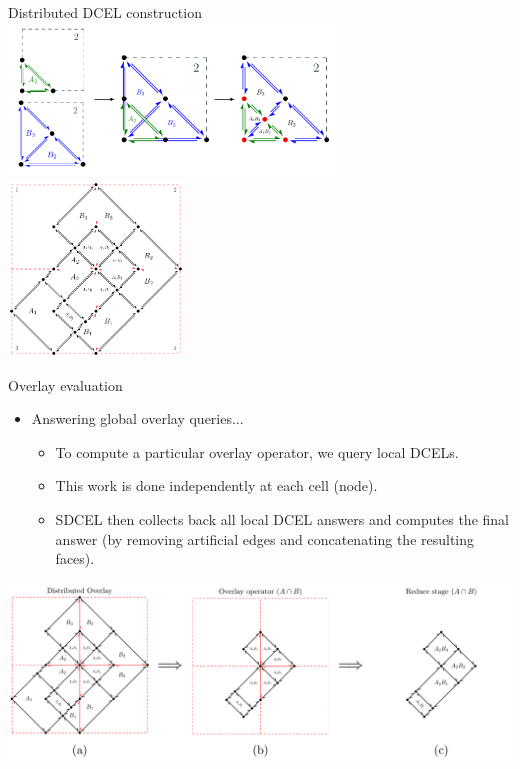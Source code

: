     \begin{frame}{Distributed DCEL construction}
        \centering
        \includegraphics[width=0.65\textwidth]{../thesis/chapterSDCEL/overlay_partition/overlay_partition} \\
        \vspace{0.5cm}
        \includegraphics[width=0.35\textwidth]{../thesis/chapterSDCEL/distributed_dcel}
    \end{frame}

   \begin{frame}{Overlay evaluation}
        \begin{itemize}
            \item Answering global overlay queries...
            \begin{itemize}
                \item To compute a particular overlay operator, we query local DCELs.
                \item This work is done independently at each cell (node).
                \item SDCEL then collects back all local DCEL answers and computes the final answer (by removing artificial edges and concatenating the resulting faces).
            \end{itemize}
        \end{itemize}
        \vspace{0.5cm}

        \centering
        \includegraphics[width=\textwidth]{../thesis/chapterSDCEL/overlay_operator}
    \end{frame}


